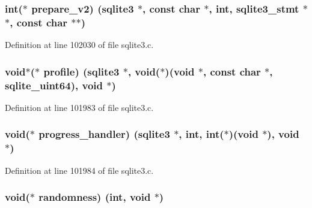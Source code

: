\subsubsection[{prepare\+\_\+v2}]{\setlength{\rightskip}{0pt plus 5cm}int($\ast$ prepare\+\_\+v2) ({\bf sqlite3} $\ast$, const char $\ast$, int, {\bf sqlite3\+\_\+stmt} $\ast$$\ast$, const char $\ast$$\ast$)}\label{structsqlite3__api__routines_aa1832f166f601aa57ead3191e60f4046}


Definition at line 102030 of file sqlite3.\+c.

\hypertarget{structsqlite3__api__routines_a6909e8b0ffe34fab2244523389cf9c9b}{}
\subsubsection[{profile}]{\setlength{\rightskip}{0pt plus 5cm}void$\ast$($\ast$ profile) ({\bf sqlite3} $\ast$, void($\ast$)(void $\ast$, const char $\ast$, {\bf sqlite\+\_\+uint64}), void $\ast$)}\label{structsqlite3__api__routines_a6909e8b0ffe34fab2244523389cf9c9b}


Definition at line 101983 of file sqlite3.\+c.

\hypertarget{structsqlite3__api__routines_a1544c31b38ea099c227c826469fbec71}{}
\subsubsection[{progress\+\_\+handler}]{\setlength{\rightskip}{0pt plus 5cm}void($\ast$ progress\+\_\+handler) ({\bf sqlite3} $\ast$, int, int($\ast$)(void $\ast$), void $\ast$)}\label{structsqlite3__api__routines_a1544c31b38ea099c227c826469fbec71}


Definition at line 101984 of file sqlite3.\+c.

\hypertarget{structsqlite3__api__routines_a36225fe3584feaef472030aa19f994a2}{}
\subsubsection[{randomness}]{\setlength{\rightskip}{0pt plus 5cm}void($\ast$ randomness) (int, void $\ast$)}\label{structsqlite3__api__routines_a36225fe3584feaef472030aa19f994a2}


